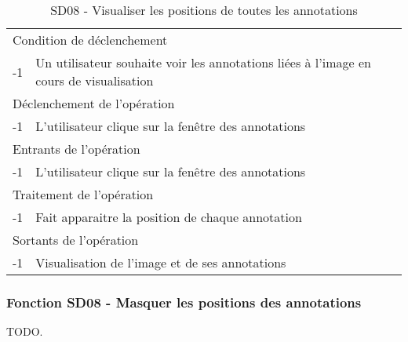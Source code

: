 \documentclass[a4paper]{article}
\begin{document}
\begin{table}[H]
  \centering
   \small
	\begin{tabular}{|c|p{12cm}|}
   		\hline
   			\rowcolor{lightgray}\multicolumn{2}{|c|}{\textbf{SD08 - Visualiser les positions de toutes les annotations}} \\
   		\hline
   			\multicolumn{2}{|l|}{Condition de d\'eclenchement} \\
   		\hline
   			-1 & Un utilisateur souhaite voir les annotations liées à l’image en cours de visualisation\\
   		\hline
   			\multicolumn{2}{|l|}{D\'eclenchement de l'op\'eration} \\
   		\hline
   			-1 & L’utilisateur clique sur la fenêtre des annotations\\
   		\hline
   			\multicolumn{2}{|l|}{Entrants de l'op\'eration} \\
   		\hline
   			-1 & L’utilisateur clique sur la fenêtre des annotations\\
   		\hline
   			\multicolumn{2}{|l|}{Traitement de l'op\'eration} \\
  		\hline
   			-1 & Fait apparaitre la position de chaque annotation\\
   		\hline
   			\multicolumn{2}{|l|}{Sortants de l'op\'eration} \\
   		\hline
   			-1 & Visualisation de l’image et de ses annotations\\
   		\hline
	\end{tabular}
  \caption{SD08 - Visualiser les positions de toutes les annotations}
  \normalsize
  \label{tab:visualiser_position_annotation}
\end{table}

\subsubsection{Fonction SD08 - Masquer les positions des annotations}
TODO.\\
\end{document}
